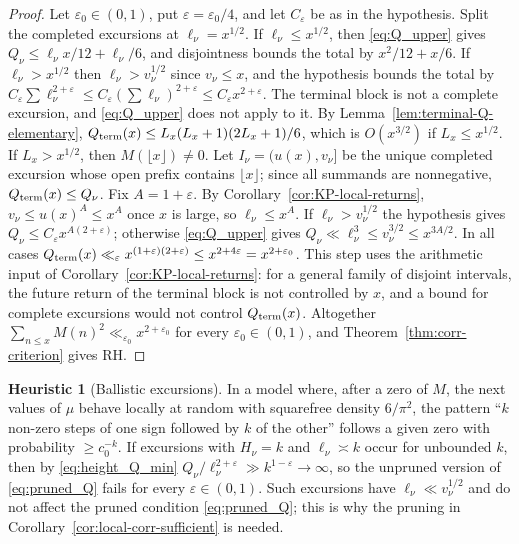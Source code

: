 \documentclass[11pt]{amsart}
\numberwithin{equation}{section}
\theoremstyle{plain}
\theoremstyle{definition}
\newtheorem{heuristic}[theorem]{Heuristic}
\theoremstyle{remark}
\newcommand{\eps}{\varepsilon}
\begin{document}
\begin{proof}
Let $\eps_0\in(0,1)$, put $\eps=\eps_0/4$, and let $C_\eps$ be as in the
hypothesis. Split the completed excursions at $\ell_\nu=x^{1/2}$. If
$\ell_\nu\le x^{1/2}$, then \eqref{eq:Q_upper} gives
$Q_\nu\le\ell_\nu x/12+\ell_\nu/6$, and disjointness bounds the total by
$x^2/12+x/6$. If $\ell_\nu>x^{1/2}$ then $\ell_\nu>v_\nu^{1/2}$ since
$v_\nu\le x$, and the hypothesis bounds the total by
$C_\eps\sum\ell_\nu^{2+\eps}\le C_\eps(\sum\ell_\nu)^{2+\eps}\le C_\eps x^{2+\eps}$.
The terminal block is not a complete excursion, and \eqref{eq:Q_upper} does
not apply to it. By Lemma~\ref{lem:terminal-Q-elementary},
$Q_{\rm term}(x)\le L_x(L_x+1)(2L_x+1)/6$, which is $O(x^{3/2})$ if $L_x\le x^{1/2}$. If $L_x>x^{1/2}$, then $M(\lfloor x\rfloor)\ne0$.  Let
$I_\nu=(u(x),v_\nu]$ be the unique completed excursion whose open prefix
contains $\lfloor x\rfloor$; since all summands are nonnegative,
$Q_{\rm term}(x)\le Q_\nu$. Fix $A=1+\eps$. By
Corollary~\ref{cor:KP-local-returns}, $v_\nu\le u(x)^A\le x^A$ once $x$ is
large, so $\ell_\nu\le x^A$. If $\ell_\nu>v_\nu^{1/2}$ the hypothesis gives
$Q_\nu\le C_\eps x^{A(2+\eps)}$; otherwise \eqref{eq:Q_upper} gives
$Q_\nu\ll\ell_\nu^3\le v_\nu^{3/2}\le x^{3A/2}$. In all cases
$Q_{\rm term}(x)\ll_\eps x^{(1+\eps)(2+\eps)}\le x^{2+4\eps}=x^{2+\eps_0}$. This step uses the arithmetic
input of Corollary~\ref{cor:KP-local-returns}: for a general family of
disjoint intervals, the future return of the terminal block is not
controlled by $x$, and a bound for complete excursions would not control
$Q_{\rm term}(x)$. Altogether
$\sum_{n\le x}M(n)^2\ll_{\eps_0}x^{2+\eps_0}$ for every $\eps_0\in(0,1)$,
and Theorem~\ref{thm:corr-criterion} gives RH.
\end{proof}

\begin{heuristic}[Ballistic excursions]
\label{heu:local_fails}
In a model where, after a zero of $M$, the next values of $\mu$ behave
locally at random with squarefree density $6/\pi^2$, the pattern ``$k$
non-zero steps of one sign followed by $k$ of the other'' follows a given
zero with probability $\ge c_0^{-k}$. If excursions with $H_\nu=k$ and
$\ell_\nu\asymp k$ occur for unbounded $k$, then by \eqref{eq:height_Q_min}
$Q_\nu/\ell_\nu^{2+\eps}\gg k^{1-\eps}\to\infty$, so the unpruned version of
\eqref{eq:pruned_Q} fails for every $\eps\in(0,1)$. Such excursions have
$\ell_\nu\ll v_\nu^{1/2}$ and do not affect the pruned condition
\eqref{eq:pruned_Q}; this is why the pruning in
Corollary~\ref{cor:local-corr-sufficient} is needed.
\end{heuristic}
\end{document}
